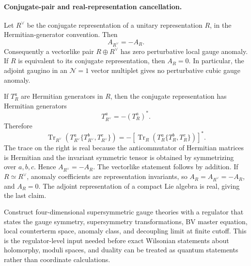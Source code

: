 \paragraph{Conjugate-pair and real-representation cancellation.}
Let \(R^\vee\) be the conjugate representation of a unitary representation
\(R\), in the Hermitian-generator convention.  Then
\[
  A_{R^\vee}=-A_R .
\]
Consequently a vectorlike pair \(R\oplus R^\vee\) has zero perturbative local
gauge anomaly.  If \(R\) is equivalent to its conjugate representation, then
\(A_R=0\).  In particular, the adjoint gaugino in an \(\mathcal N=1\) vector
multiplet gives no perturbative cubic gauge anomaly.

If \(T_R^a\) are Hermitian generators in \(R\), then the conjugate
representation has Hermitian generators
\[
  T_{R^\vee}^a=-(T_R^a)^* .
\]
Therefore
\[
  \operatorname{Tr}_{R^\vee}
  \left(T_{R^\vee}^a\{T_{R^\vee}^b,T_{R^\vee}^c\}\right)
  =
  -
  \left[
  \operatorname{Tr}_{R}
  \left(T_R^a\{T_R^b,T_R^c\}\right)
  \right]^* .
\]
The trace on the right is real because the anticommutator of Hermitian
matrices is Hermitian and the invariant symmetric tensor is obtained by
symmetrizing over \(a,b,c\).  Hence \(A_{R^\vee}=-A_R\).  The vectorlike
statement follows by addition.  If \(R\simeq R^\vee\), anomaly coefficients
are representation invariants, so \(A_R=A_{R^\vee}=-A_R\), and \(A_R=0\).
The adjoint representation of a compact Lie algebra is real, giving the last
claim.

\begin{openproblem}
\label{op:susy-gauge-regulated-ward-identities}
Construct four-dimensional supersymmetric gauge theories with a regulator
that states the gauge symmetry, supersymmetry transformations, BV master
equation, local counterterm space, anomaly class, and decoupling limit at
finite cutoff.  This is the regulator-level input needed before exact
Wilsonian statements about holomorphy, moduli spaces, and duality can be
treated as quantum statements rather than coordinate calculations.
\end{openproblem}
